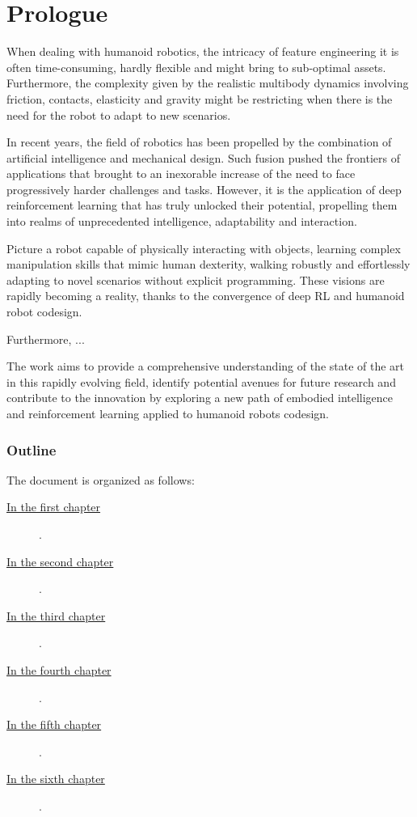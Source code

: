 \chapter*{Prologue}
\label{ch:prologue}

When dealing with humanoid robotics, the intricacy of feature engineering it is often time-consuming, hardly flexible and might bring to sub-optimal assets. Furthermore, the complexity given by the realistic multibody dynamics involving friction, contacts, elasticity and gravity might be restricting when there is the need for the robot to adapt to new scenarios.

In recent years, the field of robotics has been propelled by the combination of artificial intelligence and mechanical design. Such fusion pushed the frontiers of applications that brought to an inexorable increase of the need to face progressively harder challenges and tasks. However, it is the application of deep reinforcement learning that has truly unlocked their potential, propelling them into realms of unprecedented intelligence, adaptability and interaction. 

Picture a robot capable of physically interacting with objects, learning complex manipulation skills that mimic human dexterity, walking robustly and effortlessly adapting to novel scenarios without explicit programming. These visions are rapidly becoming a reality, thanks to the convergence of deep \ac{RL} and humanoid robot codesign.

Furthermore, ...

The work aims to provide a comprehensive understanding of the state of the art in this rapidly evolving field, identify potential avenues for future research and contribute to the innovation by exploring a new path of embodied intelligence and reinforcement learning applied to humanoid robots codesign.

\clearpage

\subsection*{Outline}
%
The document is organized as follows:
%
%
\begin{description}

\item[{\hyperref[chp:03-PhysicsSimulators]{In the first chapter}}] \lipsum[1].
\item[{\hyperref[chp:03-PhysicsSimulators]{In the second chapter}}] \lipsum[2].
\item[{\hyperref[chp:03-PhysicsSimulators]{In the third chapter}}] \lipsum[3].
\item[{\hyperref[chp:03-PhysicsSimulators]{In the fourth chapter}}] \lipsum[4].
\item[{\hyperref[chp:03-PhysicsSimulators]{In the fifth chapter}}] \lipsum[5].
\item[{\hyperref[chp:03-PhysicsSimulators]{In the sixth chapter}}] \lipsum[6].



\end{description}